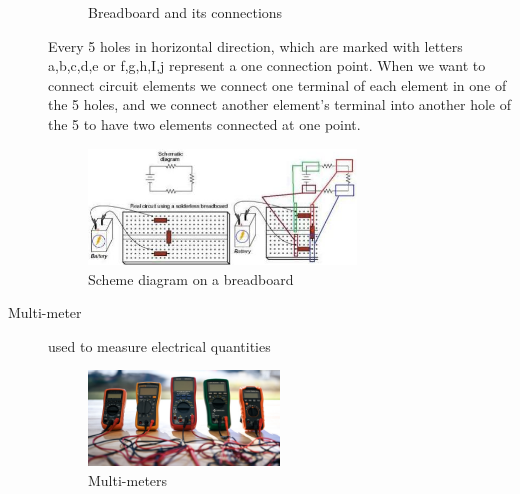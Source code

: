 \documentclass[a4paper, 10pt]{article}
\begin{document}
\begin{description}
\begin{figure}[h!]
						\caption{Breadboard and its connections}
						\label{fig:breadboard}
					\end{figure}

					Every 5 holes in horizontal direction, which are marked with letters a,b,c,d,e or f,g,h,I,j represent a one connection point.
					When we want to connect circuit elements we connect one terminal of each element in one of the 5 holes, and we connect another element’s terminal into another hole of the 5 to have two elements connected at one point.

					\begin{figure}[h!]
						\centering
						\includegraphics[width=0.7\textwidth]{./images/SchemeDiagramOnABreadboard.png}
						\caption{Scheme diagram on a breadboard}
						\label{fig:SchemeDiagramOnABreadboard}
					\end{figure}

				\item[Multi-meter] used to measure electrical quantities
					\begin{figure}[h!]
						\centering
						\includegraphics[width=0.5\textwidth]{./images/MultiMeters.jpeg}
						\caption{Multi-meters}
						\label{fig:MultiMeters}
					\end{figure}

				\pagebreak


\end{description}
\end{document}
